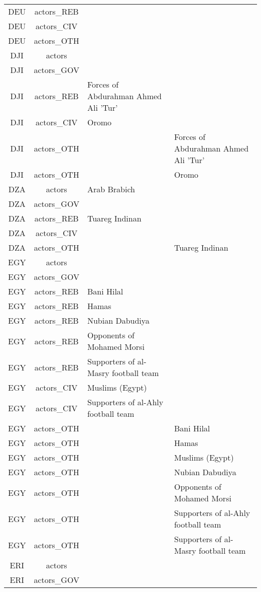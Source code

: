 \documentclass[12pt]{article}
\begin{document}
\begin{center}
\begin{longtable}{|c|c|p{7cm}|p{7cm}|}
  DEU & actors\_REB &  &  \\ 
  DEU & actors\_CIV &  &  \\ 
  DEU & actors\_OTH &  &  \\ 
  DJI & actors &  &  \\ 
  DJI & actors\_GOV &  &  \\ 
  DJI & actors\_REB & Forces of Abdurahman Ahmed Ali 'Tur' &  \\ 
  DJI & actors\_CIV & Oromo &  \\ 
  DJI & actors\_OTH &  & Forces of Abdurahman Ahmed Ali 'Tur' \\ 
  DJI & actors\_OTH &  & Oromo \\ 
  DZA & actors & Arab Brabich &  \\ 
  DZA & actors\_GOV &  &  \\ 
  DZA & actors\_REB & Tuareg Indinan &  \\ 
  DZA & actors\_CIV &  &  \\ 
  DZA & actors\_OTH &  & Tuareg Indinan \\ 
  EGY & actors &  &  \\ 
  EGY & actors\_GOV &  &  \\ 
  EGY & actors\_REB & Bani Hilal &  \\ 
  EGY & actors\_REB & Hamas &  \\ 
  EGY & actors\_REB & Nubian Dabudiya &  \\ 
  EGY & actors\_REB & Opponents of Mohamed Morsi &  \\ 
  EGY & actors\_REB & Supporters of al-Masry football team &  \\ 
  EGY & actors\_CIV & Muslims (Egypt) &  \\ 
  EGY & actors\_CIV & Supporters of al-Ahly football team &  \\ 
  EGY & actors\_OTH &  & Bani Hilal \\ 
  EGY & actors\_OTH &  & Hamas \\ 
  EGY & actors\_OTH &  & Muslims (Egypt) \\ 
  EGY & actors\_OTH &  & Nubian Dabudiya \\ 
  EGY & actors\_OTH &  & Opponents of Mohamed Morsi \\ 
  EGY & actors\_OTH &  & Supporters of al-Ahly football team \\ 
  EGY & actors\_OTH &  & Supporters of al-Masry football team \\ 
  ERI & actors &  &  \\ 
  ERI & actors\_GOV &  &  \\ 

\end{longtable}
\end{center}
\end{document}
